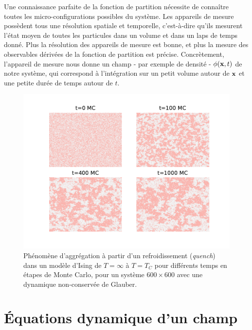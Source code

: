 Une connaissance parfaite de la fonction de partition nécessite de connaître toutes les micro-configurations possibles du système. Les appareils de mesure possèdent tous une résolution spatiale et temporelle, c'est-à-dire qu'ils mesurent l'état moyen de toutes les particules dans un volume et dans un laps de temps donné. Plus la résolution des appareils de mesure est bonne, et plus la mesure des observables dérivées de la fonction de partition est précise. 
Concrètement, l'appareil de mesure nous donne un champ - par exemple de densité - $\phi({\bf x},t)$ de notre système, qui correspond à l'intégration sur un petit volume autour de ${\bf x}$ et une petite durée de temps autour de $t$. 

\begin{figure}[h]
    \centering
    \includegraphics[width=0.9\linewidth]{intro/clusterization.pdf}
    \caption{Phénomène d'aggrégation à partir d'un refroidissement (\textit{quench}) dans un modèle d'Ising de $T=\infty$ à $T=T_C$ pour différents temps en étapes de Monte Carlo, pour un système $600 \times 600$ avec une dynamique non-conservée de Glauber.}
    \label{clusterization}
\end{figure}

\section{Équations dynamique d'un champ}

